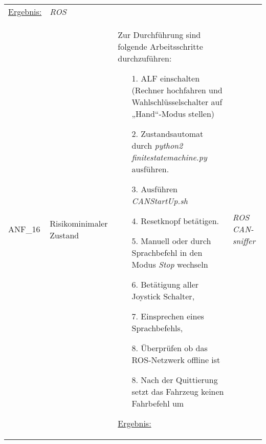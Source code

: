 \documentclass[12pt,a4paper,oneside,numbers=noenddot,captions=tableheading,toc=bibliography,openany,tikz,margin=5mm]{scrbook}
\begin{document}
\begin{longtable}{|p{}|p{}|p{7cm}|p{}|}
	\underline{Ergebnis:}\newline
	\newline
	\textbf{}%
	& \textit{ROS}\newline
	\\
		ANF\_16& Risikominimaler Zustand & Zur Durchführung sind folgende Arbeitsschritte durchzuführen:
	\begin{itemize}
		\item[1.]	ALF einschalten (Rechner hochfahren und Wahlschlüsselschalter auf „Hand“-Modus stellen)
		\item[2.]	Zustandsautomat durch \textit{python2 finitestatemachine.py} ausführen.
		\item[3.]	Ausführen \textit{CANStartUp.sh}
		\item[4.]	Resetknopf betätigen.
		\item[5.]	Manuell oder durch Sprachbefehl in den Modus \textit{Stop} wechseln
		\item[6.]	Betätigung aller Joystick Schalter,
		\item[7.]   Einsprechen eines Sprachbefehls, 
		\item[8.]	Überprüfen ob das ROS-Netzwerk offline ist
		\item[8.]	Nach der Quittierung setzt das Fahrzeug keinen Fahrbefehl um
	\end{itemize}
	
	\underline{Ergebnis:}\newline
	\newline
	\textbf{}%
	& \textit{ROS}\newline
	\textit{CAN-sniffer}
	\\
	\hline
\end{longtable} 
\end{document}
